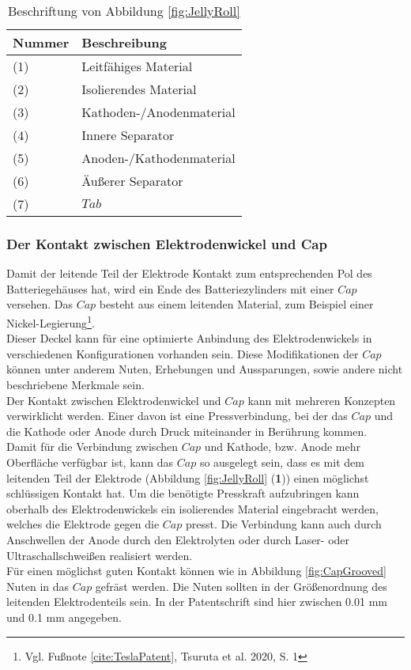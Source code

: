 \begin{table}[h!]
	\caption{Beschriftung von Abbildung \ref{fig:JellyRoll}}
	\label{tab:BeschriftungJellyRoll}
	\vspace{0.2cm}	
	\begin{tabularx}{\textwidth}{ |X|X|  }
		\toprule[1.5pt]
		\textbf{Nummer} & \textbf{Beschreibung} \\
		\hline\hline
		(1) & Leitfähiges Material \\
		\hline
		(2) & Isolierendes Material\\
		\hline
		(3) & Kathoden-/Anodenmaterial\\
		\hline
		(4) & Innere Separator\\
		\hline
		(5) & Anoden-/Kathodenmaterial\\
		\hline
		(6) & Äußerer Separator \\
		\hline
		(7) & $Tab$\\
		\bottomrule[1.5pt]
	\end{tabularx}		
\end{table}

\subsubsection*{Der Kontakt zwischen Elektrodenwickel und Cap}\label{subsub:JellyrollCapContact}

Damit der leitende Teil der Elektrode Kontakt zum entsprechenden Pol des Batteriegehäuses hat, wird ein Ende des Batteriezylinders mit einer $Cap$ versehen. Das $Cap$ besteht aus einem leitenden Material, zum Beispiel einer Nickel-Legierung\footnote{Vgl. Fußnote \ref{cite:TeslaPatent}, Tsuruta et al. 2020, S. 1}.\\
Dieser Deckel kann für eine optimierte Anbindung des Elektrodenwickels in verschiedenen Konfigurationen vorhanden sein. Diese Modifikationen der $Cap$ können unter anderem Nuten, Erhebungen und Aussparungen, sowie andere nicht beschriebene Merkmale sein.\\
Der Kontakt zwischen Elektrodenwickel und $Cap$ kann mit mehreren Konzepten verwirklicht werden. Einer davon ist eine Pressverbindung, bei der das $Cap$ und die Kathode oder Anode durch Druck miteinander in Berührung kommen.\\
Damit für die Verbindung zwischen $Cap$ und Kathode, bzw. Anode mehr Oberfläche verfügbar ist, kann das $Cap$ so ausgelegt sein, dass es mit dem leitenden Teil der Elektrode (Abbildung \ref{fig:JellyRoll} (\textbf{1})) einen möglichst schlüssigen Kontakt hat. Um die benötigte Presskraft aufzubringen kann oberhalb des Elektrodenwickels ein isolierendes Material eingebracht werden, welches die Elektrode gegen die $Cap$ presst. Die Verbindung kann auch durch Anschwellen der Anode durch den Elektrolyten oder durch Laser- oder Ultraschallschweißen realisiert werden.\\
Für einen möglichst guten Kontakt können wie in Abbildung \ref{fig:CapGrooved} Nuten in das $Cap$ gefräst werden. Die Nuten sollten in der Größenordnung des leitenden Elektrodenteils sein. In der Patentschrift sind hier zwischen 0.01 mm und 0.1 mm angegeben.\\

